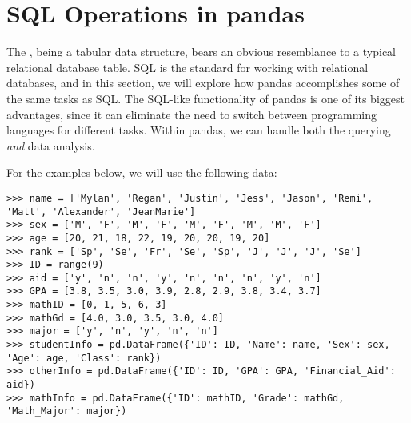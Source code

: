 \begin{comment}
The random walk is shown in Figure \ref{fig:PandasRandomWalk}.

\begin{figure}
\centering
\texttt{[image: randomWalk.pdf]}
\caption{Random walk of length 1000.}
\label{fig:PandasRandomWalk}
\end{figure}

\begin{problem}
Create five random walks of length 100, and plot them together in the same plot.

Next, create a ``biased'' random walk by changing the coin flip probability of head from 0.5 to 0.51.
Plot this biased walk with lengths 100, 10000, and then 100000.
Notice the definite trend that emerges.
Your results should be comparable to those in Figure \ref{pandas:biasedRandomWalk}.
\end{problem}

\begin{figure}
\centering
\texttt{[image: biasedRandomWalk.pdf]}
\caption{Biased random walk of length 100 (above) and 10000 (below).}
\label{pandas:biasedRandomWalk}
\end{figure}
\end{comment}

\section*{SQL Operations in pandas} %

The , being a tabular data structure, bears an obvious resemblance to a typical relational
database table.
SQL is the standard for working with relational databases, and in this section, we will
explore how pandas accomplishes some of the same tasks as SQL.
The SQL-like functionality of pandas is
one of its biggest advantages, since it can eliminate the need to switch between programming languages
for different tasks.
Within pandas, we can handle both the querying \emph{and} data analysis.

For the examples below, we will use the following data:
\begin{lstlisting}
>>> name = ['Mylan', 'Regan', 'Justin', 'Jess', 'Jason', 'Remi', 'Matt', 'Alexander', 'JeanMarie']
>>> sex = ['M', 'F', 'M', 'F', 'M', 'F', 'M', 'M', 'F']
>>> age = [20, 21, 18, 22, 19, 20, 20, 19, 20]
>>> rank = ['Sp', 'Se', 'Fr', 'Se', 'Sp', 'J', 'J', 'J', 'Se']
>>> ID = range(9)
>>> aid = ['y', 'n', 'n', 'y', 'n', 'n', 'n', 'y', 'n']
>>> GPA = [3.8, 3.5, 3.0, 3.9, 2.8, 2.9, 3.8, 3.4, 3.7]
>>> mathID = [0, 1, 5, 6, 3]
>>> mathGd = [4.0, 3.0, 3.5, 3.0, 4.0]
>>> major = ['y', 'n', 'y', 'n', 'n']
>>> studentInfo = pd.DataFrame({'ID': ID, 'Name': name, 'Sex': sex, 'Age': age, 'Class': rank})
>>> otherInfo = pd.DataFrame({'ID': ID, 'GPA': GPA, 'Financial_Aid': aid})
>>> mathInfo = pd.DataFrame({'ID': mathID, 'Grade': mathGd, 'Math_Major': major})
\end{lstlisting}

